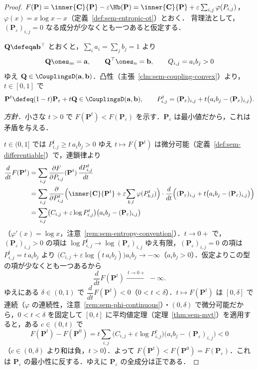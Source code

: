 \begin{proof}
  $F(\mathbf{P}) = \inner{\mathbf{C}}{\mathbf{P}} - \varepsilon\Hb(\mathbf{P}) = \inner{\mathbf{C}}{\mathbf{P}} + \varepsilon\sum_{i,j}\varphi(P_{i,j})$，$\varphi(x) = x\log x - x$（定義~\ref{def:sem-entropic-ot}）とおく．
  背理法として，$(\mathbf{P}_\varepsilon)_{i,j} = 0$ なる成分が少なくとも一つあると仮定する．

  $\mathbf{Q} \defeq \mathbf{a}\mathbf{b}^\top$ とおくと，$\sum_i a_i = \sum_j b_j = 1$ より
  \[
    \mathbf{Q}\ones_m = \mathbf{a}, \qquad
    \mathbf{Q}^\top\ones_n = \mathbf{b}, \qquad
    Q_{i,j} = a_i b_j > 0
  \]
  ゆえ $\mathbf{Q} \in \CouplingsD(\mathbf{a}, \mathbf{b})$．凸性（主張~\ref{clm:sem-coupling-convex}）より，$t \in [0,1]$ で
  \[
    \mathbf{P}^t \defeq (1-t)\mathbf{P}_\varepsilon + t\mathbf{Q} \in \CouplingsD(\mathbf{a}, \mathbf{b}),
    \qquad
    P^t_{i,j} = (\mathbf{P}_\varepsilon)_{i,j} + t\bigl(a_i b_j - (\mathbf{P}_\varepsilon)_{i,j}\bigr) .
  \]

  \emph{方針．}小さな $t > 0$ で $F(\mathbf{P}^t) < F(\mathbf{P}_\varepsilon)$ を示す．$\mathbf{P}_\varepsilon$ は最小値だから，これは矛盾を与える．

  $t \in (0,1]$ では $P^t_{i,j} \ge t\,a_i b_j > 0$ ゆえ $t \mapsto F(\mathbf{P}^t)$ は微分可能（定義~\ref{def:sem-differentiable}）で，連鎖律より
  \begin{align*}
    \frac{d}{dt} F(\mathbf{P}^t)
    &= \sum_{i,j} \frac{\partial F}{\partial P_{i,j}}(\mathbf{P}^t)\,\frac{dP^t_{i,j}}{dt} \\
    &= \sum_{i,j}
       \frac{\partial}{\partial P^t_{i,j}}\Bigl( \inner{\mathbf{C}}{\mathbf{P}^t} + \varepsilon\!\sum_{k,l}\varphi(P^t_{k,l}) \Bigr)
       \cdot \frac{d}{dt}\Bigl( (\mathbf{P}_\varepsilon)_{i,j} + t\bigl(a_i b_j - (\mathbf{P}_\varepsilon)_{i,j}\bigr) \Bigr) \\
    &= \sum_{i,j} \bigl( C_{i,j} + \varepsilon\log P^t_{i,j} \bigr)\bigl( a_i b_j - (\mathbf{P}_\varepsilon)_{i,j} \bigr)
  \end{align*}
  （$\varphi'(x) = \log x$，注意~\ref{rem:sem-entropy-convention}）．$t \to 0+$ で，$(\mathbf{P}_\varepsilon)_{i,j} > 0$ の項は $\log P^t_{i,j} \to \log (\mathbf{P}_\varepsilon)_{i,j}$ ゆえ有限，$(\mathbf{P}_\varepsilon)_{i,j} = 0$ の項は $P^t_{i,j} = t\,a_i b_j$ より $\bigl(C_{i,j} + \varepsilon\log(t\,a_i b_j)\bigr)a_i b_j \to -\infty$（$a_i b_j > 0$）．仮定よりこの型の項が少なくとも一つあるから
  \[
    \frac{d}{dt} F(\mathbf{P}^t) \xrightarrow{\ t \to 0+\ } -\infty .
  \]
  ゆえにある $\delta \in (0,1)$ で $\dfrac{d}{dt} F(\mathbf{P}^t) < 0$（$0 < t < \delta$）．$t \mapsto F(\mathbf{P}^t)$ は $[0,\delta]$ で連続（$\varphi$ の連続性，注意~\ref{rem:sem-phi-continuous}）・$(0,\delta)$ で微分可能だから，$0 < t < \delta$ を固定して $[0,t]$ に平均値定理（定理~\ref{thm:sem-mvt}）を適用すると，ある $c \in (0,t)$ で
  \[
    F(\mathbf{P}^t) - F(\mathbf{P}^0)
    = t \sum_{i,j}\bigl(C_{i,j} + \varepsilon\log P^c_{i,j}\bigr)\bigl(a_i b_j - (\mathbf{P}_\varepsilon)_{i,j}\bigr) < 0
  \]
  （$c \in (0,\delta)$ より和は負，$t > 0$）．よって $F(\mathbf{P}^t) < F(\mathbf{P}^0) = F(\mathbf{P}_\varepsilon)$．これは $\mathbf{P}_\varepsilon$ の最小性に反する．ゆえに $\mathbf{P}_\varepsilon$ の全成分は正である．
\end{proof}

